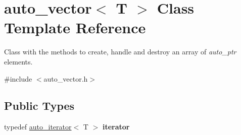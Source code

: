 \hypertarget{classauto__vector}{\section{auto\-\_\-vector$<$ T $>$ Class Template Reference}
\label{classauto__vector}
}


Class with the methods to create, handle and destroy an array of {\itshape auto\-\_\-ptr} elements.  




{\ttfamily \#include $<$auto\-\_\-vector.\-h$>$}

\subsection*{Public Types}
\begin{DoxyCompactItemize}
\item 
\hypertarget{classauto__vector_a0851c5a49cd4b8b5e5bc9d1319c53c9e}{typedef \hyperlink{classauto__iterator}{auto\-\_\-iterator}$<$ T $>$ {\bfseries iterator}}\label{classauto__vector_a0851c5a49cd4b8b5e5bc9d1319c53c9e}

\end{DoxyCompactItemize}
